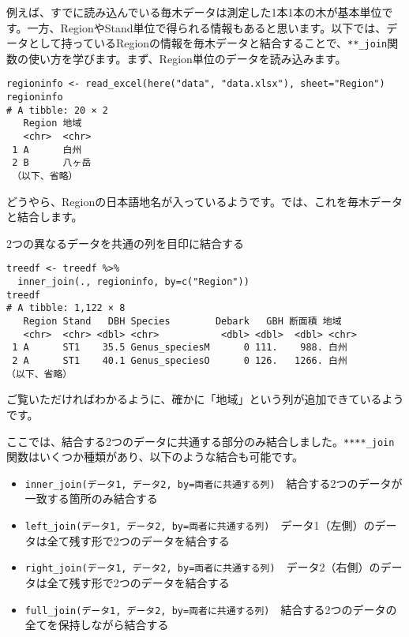 例えば、すでに読み込んでいる毎木データは測定した1本1本の木が基本単位です。一方、RegionやStand単位で得られる情報もあると思います。以下では、データとして持っているRegionの情報を毎木データと結合することで、\verb|**_join|関数の使い方を学びます。まず、Region単位のデータを読み込みます。

\begin{verbatim}
regioninfo <- read_excel(here("data", "data.xlsx"), sheet="Region")
regioninfo
# A tibble: 20 × 2
   Region 地域    
   <chr>  <chr>   
 1 A      白州    
 2 B      八ヶ岳  
 （以下、省略）
\end{verbatim}

どうやら、Regionの日本語地名が入っているようです。では、これを毎木データと結合します。

\begin{itembox}[l]{2つの異なるデータを共通の列を目印に結合する}
\begin{verbatim}
treedf <- treedf %>%
  inner_join(., regioninfo, by=c("Region"))
treedf
# A tibble: 1,122 × 8
   Region Stand   DBH Species        Debark   GBH 断面積 地域 
   <chr>  <chr> <dbl> <chr>           <dbl> <dbl>  <dbl> <chr>
 1 A      ST1    35.5 Genus_speciesM      0 111.    988. 白州 
 2 A      ST1    40.1 Genus_speciesO      0 126.   1266. 白州 
（以下、省略）
\end{verbatim}
\end{itembox}

ご覧いただければわかるように、確かに「地域」という列が追加できているようです。

ここでは、結合する2つのデータに共通する部分のみ結合しました。\verb|****_join|関数はいくつか種類があり、以下のような結合も可能です。
\begin{itemize}
  \item {}\verb|inner_join(データ1, データ2, by=両者に共通する列)|　結合する2つのデータが一致する箇所のみ結合する
  \item {}\verb|left_join(データ1, データ2, by=両者に共通する列)|　データ1（左側）のデータは全て残す形で2つのデータを結合する
  \item {}\verb|right_join(データ1, データ2, by=両者に共通する列)|　データ2（右側）のデータは全て残す形で2つのデータを結合する
  \item {}\verb|full_join(データ1, データ2, by=両者に共通する列)|　結合する2つのデータの全てを保持しながら結合する
\end{itemize}

